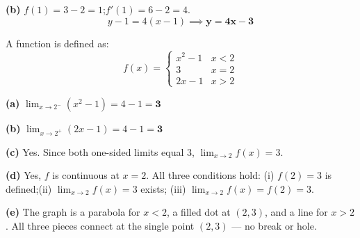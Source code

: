 \documentclass[addpoints]{exam}
\begin{document}
\begin{questions}
\begin{solution}[9cm]
\textbf{(b)} $f(1) = 3 - 2 = 1$;\quad $f'(1) = 6 - 2 = 4$.
\[
y - 1 = 4(x - 1) \implies \mathbf{y = 4x - 3}
\]
\end{solution}

\question A function is defined as:
\[
f(x) = \begin{cases} x^2 - 1 & x < 2 \\ 3 & x = 2 \\ 2x - 1 & x > 2 \end{cases}
\]
\begin{solution}[8cm]
\textbf{(a)} $\displaystyle\lim_{x \to 2^-}(x^2 - 1) = 4 - 1 = \mathbf{3}$

\textbf{(b)} $\displaystyle\lim_{x \to 2^+}(2x - 1) = 4 - 1 = \mathbf{3}$

\textbf{(c)} Yes. Since both one-sided limits equal 3, $\displaystyle\lim_{x \to 2} f(x) = 3$.

\textbf{(d)} Yes, $f$ is continuous at $x = 2$. All three conditions hold:
(i) $f(2) = 3$ is defined;\quad (ii) $\displaystyle\lim_{x \to 2}f(x) = 3$ exists;\quad
(iii) $\displaystyle\lim_{x \to 2}f(x) = f(2) = 3$. \checkmark

\textbf{(e)} The graph is a parabola for $x < 2$, a filled dot at $(2,3)$, and a line for $x > 2$.
All three pieces connect at the single point $(2, 3)$ --- no break or hole.
\end{solution}

\end{questions}
\end{document}
